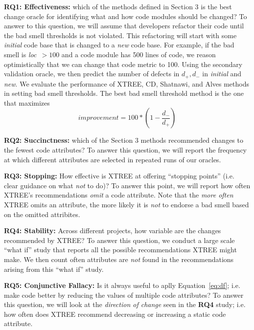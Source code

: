\documentclass[twocolumn,5p]{elsarticle}
\newcommand{\eq}[1]{Equation~\ref{eq:#1}}
\theoremstyle{break}
\begin{document}
\begin{itemize}
{\bf RQ1: Effectiveness: } which of the methods defined in Section 3 is the best change oracle for identifying what and how code modules should be changed? 
To   answer to this question, we will assume that developers
refactor their code until the bad smell thresholds is not violated.
This refactoring will start with some {\em initial} code
base that is changed to a {\em new} code base. 
For example, if the bad smell is \mbox{{\em loc $>100$}} and a 
code module has 500 lines of code, we reason
optimistically that we can change that code metric
to 100.  
Using the secondary validation oracle,  we then predict the
number of defects in $d_+,d_-$ in {\em initial} and {\em new}. We evaluate the performance of XTREE, CD, Shatnawi, and Alves methods in setting bad smell thresholds.
The best bad smell threshold method is the one that maximizes
\begin{equation}\label{eq:diff}
\mathit{improvement} = 100* \left(1 - \frac{ d_- }{ d_+}\right)
\end{equation}


{\bf RQ2: Succinctness: } which of the Section 3 methods recommended changes to the fewest code attributes?
To answer this question, we will report the frequency at which different attributes are selected in repeated runs of our oracles.

{\bf RQ3: Stopping: }    How effective is XTREE at offering   ``stopping points'' (i.e. clear guidance on what {\em not} to do)?   
To answer this point, we will report how often XTREE's recommendations {\em omit} a code attribute. 
Note that the {\em more often} XTREE omits an attribute, the more likely it is {\em not} to endorse a bad smell based on the omitted
attribites.

{\bf RQ4: Stability:} Across different projects, how variable are the changes recommended by XTREE?   To answer this
question, we conduct a large scale ``what if'' study that reports all the possible recommendations XTREE might make.
We then count often attributes are {\em not} found in the recommendations arising from this ``what if'' study.

{\bf RQ5: Conjunctive Fallacy:} Is  it  always  useful  to  aplly \eq{df}; i.e.   make  code  better  by  reducing  the  values  of multiple code attributes? To answer this question, we will look at the {\em direction of change} seen in the {\bf RQ4} study; i.e.
how often does XTREE recommend decreasing or increasing a static code attribute.


 
  


\end{itemize}
\end{document}
